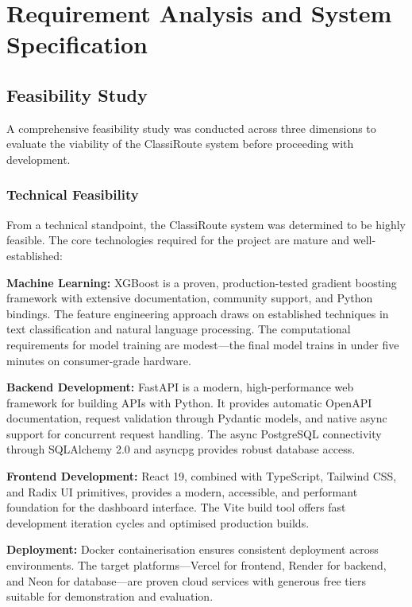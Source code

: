 \documentclass[oneside,12pt,a4paper]{report}
\begin{document}
\chapter{Requirement Analysis and System Specification}

\section{Feasibility Study}

A comprehensive feasibility study was conducted across three dimensions to evaluate the viability of the ClassiRoute system before proceeding with development.

\subsection{Technical Feasibility}

From a technical standpoint, the ClassiRoute system was determined to be highly feasible. The core technologies required for the project are mature and well-established:

\textbf{Machine Learning:} XGBoost is a proven, production-tested gradient boosting framework with extensive documentation, community support, and Python bindings. The feature engineering approach draws on established techniques in text classification and natural language processing. The computational requirements for model training are modest---the final model trains in under five minutes on consumer-grade hardware.

\textbf{Backend Development:} FastAPI is a modern, high-performance web framework for building APIs with Python. It provides automatic OpenAPI documentation, request validation through Pydantic models, and native async support for concurrent request handling. The async PostgreSQL connectivity through SQLAlchemy 2.0 and asyncpg provides robust database access.

\textbf{Frontend Development:} React 19, combined with TypeScript, Tailwind CSS, and Radix UI primitives, provides a modern, accessible, and performant foundation for the dashboard interface. The Vite build tool offers fast development iteration cycles and optimised production builds.

\textbf{Deployment:} Docker containerisation ensures consistent deployment across environments. The target platforms---Vercel for frontend, Render for backend, and Neon for database---are proven cloud services with generous free tiers suitable for demonstration and evaluation.
\end{document}
